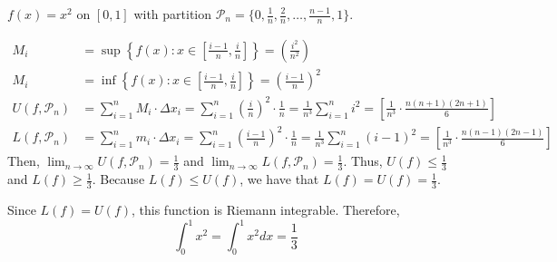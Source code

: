 \begin{example}{}{}
    $f(x) = x^2$ on $[0, 1]$ with partition $\mathcal{\mathcal{P}}_n = \{0, \frac{1}{n}, \frac{2}{n}, \ldots, \frac{n - 1}{n}, 1\}$.

    \begin{align*}
        M_i &= \sup \left\{f(x) : x \in \left[\frac{i - 1}{n}, \frac{i}{n}\right]\right\} = \left(\frac{i^2}{n^2}\right) \\
        M_i &= \inf \left\{f(x) : x \in \left[\frac{i - 1}{n}, \frac{i}{n}\right]\right\} = \left(\frac{i - 1}{n}\right)^2 \\
        U(f, \mathcal{\mathcal{P}}_n) &= \sum_{i = 1}^n M_i \cdot \Delta x_i = \sum_{i = 1}^n \left(\frac{i}{n}\right)^2 \cdot \frac{1}{n} = \frac{1}{n^3} \sum_{i = 1}^n i^2 = \left[\frac{1}{n^3} \cdot \frac{n(n + 1)(2n + 1)}{6}\right] \\
        L(f, \mathcal{\mathcal{P}}_n) &= \sum_{i = 1}^n m_i \cdot \Delta x_i = \sum_{i = 1}^n \left(\frac{i - 1}{n}\right)^2 \cdot \frac{1}{n} = \frac{1}{n^3} \sum_{i = 1}^n (i - 1)^2 = \left[\frac{1}{n^3} \cdot \frac{n(n - 1)(2n - 1)}{6}\right]
    \end{align*}
    Then, $\lim_{n \to \infty} U(f, \mathcal{\mathcal{P}}_n) = \frac{1}{3}$ and $\lim_{n \to \infty} L(f, \mathcal{\mathcal{P}}_n) = \frac{1}{3}$. Thus, $U(f) \leq \frac{1}{3}$ and $L(f) \geq \frac{1}{3}$. Because $L(f) \leq U(f)$, we have that $L(f) = U(f) = \frac{1}{3}$.

    Since $L(f) = U(f)$, this function is Riemann integrable. Therefore, $$\int_0^1 x^2 = \int_0^1 x^2dx = \frac{1}{3}$$
\end{example}

